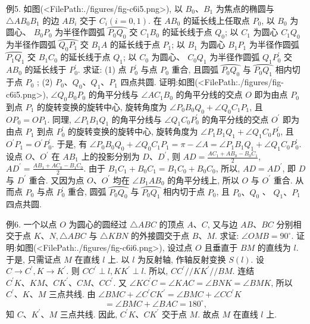 例5. 如图(<FilePath:./figures/fig-c6i5.png>), 以 $B_0 、 B_1$ 为焦点的椭圆与 $\triangle A B_0 B_1$ 的边 $A B_i$ 交于 $C_i(i=0,1)$. 在 $A B_0$ 的延长线上任取点 $P_0$, 以 $B_0$ 为圆心、 $B_0 P_0$ 为半径作圆弧 $\overparen{P_0 Q_0}$ 交 $C_1 B_0$ 的延长线于点 $Q_0$; 以 $C_1$ 为圆心 $C_1 Q_0$ 为半径作圆弧 $\overparen{Q_0 P_1}$ 交 $B_1 A$ 的延长线于点 $P_1$; 以 $B_1$ 为圆心 $B_1 P_1$ 为半径作圆弧 $\overparen{P_1 Q_1}$ 交 $B_1 C_0$ 的延长线于点 $Q_1$; 以 $C_0$ 为圆心、 $C_0 Q_1$ 为半径作圆弧 $Q_1 P_0^{\prime}$ 交 $A B_0$ 的延长线于 $P_0^{\prime}$. 求证:
(1) 点 $P_0^{\prime}$ 与点 $P_0$ 重合, 且圆弧 $\overparen{P_0 Q_0}$ 与 $\overparen{P_0 Q_1}$ 相内切于点 $P_0$ ;
(2) $P_0 、 Q_0 、 Q_1 、 P_1$ 四点共圆.
证明:如图(<FilePath:./figures/fig-c6i5.png>), $\angle Q_0 B_0 P_0$ 的角平分线与 $\angle A C_1 B_0$ 的角平分线的交点 $O$ 即为由点 $P_0$ 到点 $P_1$ 的旋转变换的旋转中心, 旋转角度为 $\angle P_0 B_0 Q_0+ \angle Q_0 C_1 P_1$, 且 $O P_0=O P_1$.
同理, $\angle P_1 B_1 Q_1$ 的角平分线与 $\angle Q_1 C_0 P_0^{\prime}$ 的角平分线的交点 $O^{\prime}$ 即为由点 $P_1$ 到点 $P_0^{\prime}$ 的旋转变换的旋转中心, 旋转角度为 $\angle P_1 B_1 Q_1+\angle Q_1 C_0 P_0^{\prime}$, 且
$O^{\prime} P_1=O^{\prime} P_0^{\prime}$.
于是, 有 $\angle P_0 B_0 Q_0+\angle Q_0 C_1 P_1=\pi-\angle A=\angle P_1 B_1 Q_1+\angle Q_1 C_0 P_0^{\prime}$.
设点 $O 、 O^{\prime}$ 在 $A B_1$ 上的投影分别为 $D 、 D^{\prime}$, 则 $A D=\frac{A C_1+A B_0-B_0 C_1}{2}$, $A D^{\prime}=\frac{A B_1+A C_0-B_1 C_0}{2}$.
由于 $B_1 C_1+B_0 C_1=B_1 C_0+B_0 C_0$, 所以, $A D=A D^{\prime}$, 即 $D$ 与 $D^{\prime}$ 重合.
又因为点 $O 、 O^{\prime}$ 均在 $\angle B_1 A B_0$ 的角平分线上, 所以 $O$ 与 $O^{\prime}$ 重合.
从而点 $P_0$ 与点 $P_0^{\prime}$ 重合, 圆弧 $\overparen{P_0 Q_0}$ 与 $\overparen{P_0 Q_1}$ 相内切于点 $P_0$, 且 $P_0 、 Q_0$ 、 $Q_1 、 P_1$ 四点共圆.



例6. 一个以点 $O$ 为圆心的圆经过 $\triangle A B C$ 的顶点 $A 、 C$, 又与边 $A B 、 B C$ 分别相交于点 $K 、 N, \triangle A B C$ 与 $\triangle K B N$ 的外接圆交于点 $B 、 M$. 求证: $\angle O M B=90^{\circ}$.
证明:如图(<FilePath:./figures/fig-c6i6.png>), 设过点 $O$ 且垂直于 $B M$ 的直线为 $l$.
于是, 只需证点 $M$ 在直线 $l$ 上.
以 $l$ 为反射轴, 作轴反射变换 $S(l)$.
设 $C \rightarrow C^{\prime}, K \rightarrow K^{\prime}$.
则 $C C^{\prime} \perp l, K K^{\prime} \perp l$.
所以, $C C^{\prime} / / K K^{\prime} / / B M$.
连结 $C^{\prime} K 、 K M 、 C K^{\prime} 、 C M 、 C C^{\prime}$.
又 $\angle K C^{\prime} C=\angle K A C=\angle B N K=\angle B M K$, 所以 $C^{\prime} 、 K 、 M$ 三点共线.
由 $\angle B M C+\angle C^{\prime} C K^{\prime}=\angle B M C+\angle C C^{\prime} K$
$$
=\angle B M C+\angle B A C=180^{\circ},
$$
知 $C 、 K^{\prime} 、 M$ 三点共线.
因此, $C^{\prime} K 、 C K^{\prime}$ 交于点 $M$.
故点 $M$ 在直线 $l$ 上.



